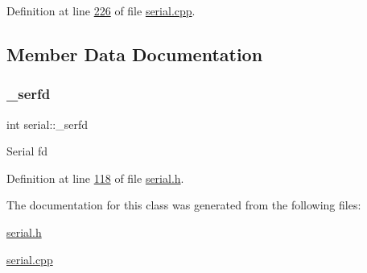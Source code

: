 Definition at line \mbox{\hyperlink{serial_8cpp_source_l00226}{226}} of file \mbox{\hyperlink{serial_8cpp_source}{serial.\+cpp}}.



\subsection{Member Data Documentation}
\mbox{\label{classserial_af9528290d0aecf4a4377fbacf3431a17}} 
\subsubsection{\texorpdfstring{\+\_\+serfd}{\_serfd}}
{\footnotesize\ttfamily int serial\+::\+\_\+serfd\hspace{0.3cm}{\ttfamily [private]}}

Serial fd 

Definition at line \mbox{\hyperlink{serial_8h_source_l00118}{118}} of file \mbox{\hyperlink{serial_8h_source}{serial.\+h}}.



The documentation for this class was generated from the following files\+:\begin{DoxyCompactItemize}
\item 
\mbox{\hyperlink{serial_8h}{serial.\+h}}\item 
\mbox{\hyperlink{serial_8cpp}{serial.\+cpp}}\end{DoxyCompactItemize}
